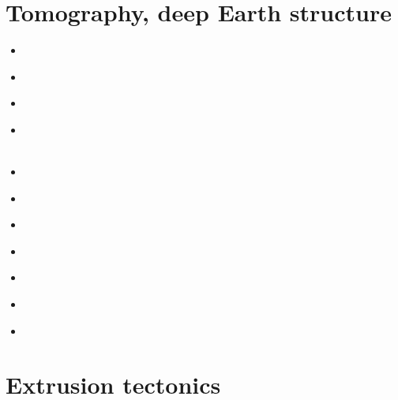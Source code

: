 \section{Tomography, deep Earth structure}
\begin{scriptsize}
\begin{itemize}
\item[\nineteeneightyone] 
\textcite{dzan81} \\
\item[\nineteenninetyone] 
\textcite{spak91} \\
\item[\nineteenninetythree] 
\textcite{kara93} \\
\item[\nineteenninetyeight] 
\textcite{sagu98} \\
\textcite{gusa98} \\
\item[\twothousandnine] 
\textcite{scbr09} \\
\item[\twothousandthree] 
\textcite{pimo03} \\
\item[\twothousandten] 
\textcite{sifb10} \\ 
\item[\twothousandeleven]
\textcite{ridv11} \\
\item[\twothousandthirteen] 
\textcite{fopa13} \\ 
\item[\twothousandsixteen] 
\textcite{moek16} \\
\item[\twothousandeighteen] 
\textcite{homs18} \\
\end{itemize}
\end{scriptsize}


\section{Extrusion tectonics}


